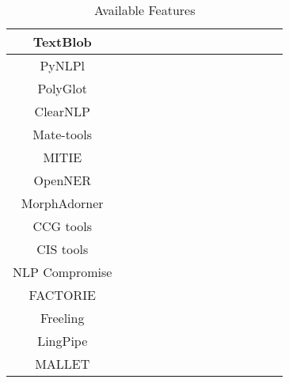 \begin{landscape}
\begin{table}[H]
{\begin{tabu}{|c|c|c|c|c|c|c|c|c|c|c|c|c|c|}
\hline
	 TextBlob & \ccheck  & \ccheck & \ccheck & \ccheck  & \xcheck & \xcheck & \ccheck & \xcheck & \ccheck & \xcheck & \xcheck & \ccheck & \ccheck \\
\hline
	 PyNLPl & \ccheck  & \ccheck & \xcheck & \xcheck  & \xcheck & \xcheck & \xcheck & \xcheck & \xcheck & \xcheck & \xcheck & \xcheck & \ccheck \\
\hline
	 PolyGlot & \ccheck  & \xcheck & \ccheck & \ccheck  & \ccheck & \xcheck & \xcheck & \xcheck & \ccheck & \xcheck & \xcheck & \xcheck & \xcheck \\
\hline
	  ClearNLP & \ccheck  & \xcheck & \ccheck & \ccheck  & \ccheck & \xcheck & \ccheck & \ccheck & \xcheck & \xcheck & \xcheck & \xcheck & \xcheck \\
\hline
	  Mate-tools & \xcheck  & \xcheck & \ccheck & \ccheck  & \xcheck & \xcheck & \ccheck & \xcheck & \xcheck & \xcheck & \xcheck & \ccheck & \xcheck \\
\hline
	  MITIE & \ccheck  & \xcheck & \xcheck & \xcheck  & \ccheck & \xcheck & \xcheck & \xcheck & \xcheck & \ccheck & \xcheck & \xcheck & \xcheck \\
\hline
	  OpenNER & \ccheck  & \ccheck & \xcheck & \ccheck  & \ccheck & \xcheck & \ccheck & \ccheck & \ccheck & \xcheck & \xcheck & \xcheck & \xcheck \\
\hline
	  MorphAdorner & \ccheck  & \xcheck & \ccheck & \ccheck  & \ccheck & \xcheck & \xcheck & \xcheck & \xcheck & \xcheck & \xcheck & \xcheck & \xcheck \\
\hline
	  CCG tools & \ccheck  & \xcheck & \ccheck & \ccheck  & \ccheck & \ccheck & \ccheck & \ccheck & \xcheck & \xcheck & \xcheck & \xcheck & \xcheck \\
\hline
	  CIS tools & \ccheck  & \xcheck & \ccheck & \ccheck  & \xcheck & \xcheck & \ccheck & \ccheck & \xcheck & \xcheck & \xcheck & \xcheck & \xcheck \\
\hline
	  NLP Compromise & \ccheck  & \ccheck & \xcheck & \ccheck  & \xcheck & \xcheck & \xcheck & \xcheck & \xcheck & \xcheck & \xcheck & \xcheck & \xcheck \\
\hline
	  FACTORIE & \ccheck  & \xcheck & \xcheck & \ccheck  & \ccheck & \xcheck & \ccheck & \ccheck & \xcheck & \xcheck & \xcheck & \ccheck & \ccheck \\
\hline
	  Freeling & \ccheck  & \xcheck & \ccheck & \ccheck  & \ccheck & \xcheck & \ccheck & \ccheck & \xcheck & \xcheck & \xcheck & \xcheck & \xcheck \\
\hline
	  LingPipe & \ccheck  & \ccheck & \ccheck & \xcheck  & \xcheck & \ccheck & \xcheck & \xcheck & \ccheck & \xcheck & \xcheck & \ccheck & \ccheck \\
\hline
	  MALLET & \ccheck  & \ccheck & \xcheck & \xcheck  & \ccheck & \xcheck & \xcheck & \xcheck & \xcheck & \xcheck & \xcheck & \ccheck & \ccheck \\
\hline
\end{tabu}%
}
\caption[Available Features]{Available Features}
\label{tab:summary_tech_art}
\end{table}
\end{landscape}

